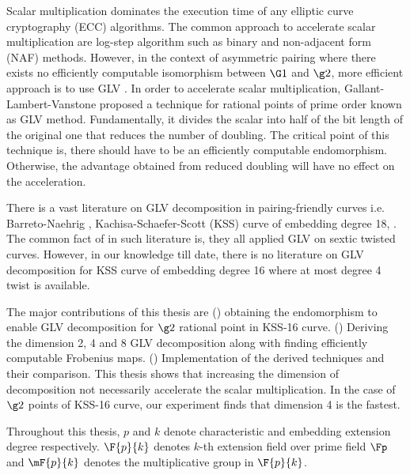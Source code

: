 Scalar multiplication dominates the execution time of any elliptic curve cryptography (ECC) algorithms.
The common approach to accelerate scalar multiplication are log-step algorithm such as binary and non-adjacent form (NAF) methods.
However, in the context of asymmetric pairing where there exists no efficiently computable isomorphism between $\G1$ and $\g2$, more efficient approach is to use GLV \cite{CANS:SNOKM08, khandaker2017improvement}.
In order to accelerate scalar multiplication, Gallant-Lambert-Vanstone \cite{C:GalLamVan01} proposed a technique for rational points of prime order known as GLV method.
Fundamentally, it divides the scalar into half of the bit length of the original one that reduces the number of doubling.
The critical point of this technique is, there should have to be an efficiently computable endomorphism. 
Otherwise, the advantage obtained from reduced doubling will have no effect on the acceleration. 


There is a vast literature on GLV decomposition in pairing-friendly curves i.e.  Barreto-Naehrig \cite{SAC:BarNae05}, Kachisa-Schaefer-Scott (KSS) curve of embedding degree 18,  \cite{CANS:SNOKM08, khandaker2017improvement, DBLP:journals/ieicet/NogamiSONAM09, faz2015efficient, JC:GalLinSco11}. 
The common fact of in such literature is, they all applied GLV on sextic twisted curves. 
However, in our knowledge till date, there is no literature on GLV decomposition for  KSS curve of embedding degree 16 where at most degree 4 twist is available.

The major contributions of this thesis are () obtaining the endomorphism to enable GLV decomposition for $\g2$ rational point in KSS-16 curve. 
() Deriving the dimension 2, 4 and 8 GLV decomposition along with finding efficiently computable Frobenius maps. () Implementation of the derived techniques and their comparison. 
This thesis shows that increasing the dimension of decomposition not necessarily accelerate the scalar multiplication. 
In the case of $\g2$ points of KSS-16 curve, our experiment finds that dimension 4 is the fastest. 

Throughout this thesis, $p$ and $k$ denote characteristic and embedding extension degree respectively. $\F{p}{k}$ denotes $k$-th extension field over prime field $\Fp$ and $\mF{p}{k}$ denotes the multiplicative group in $\F{p}{k}$.

